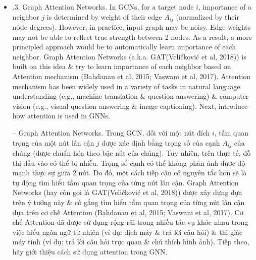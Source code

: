 \documentclass{article}
\begin{document}
\begin{itemize}
\begin{itemize}
\begin{itemize}
            {\bf Connections with Spectral Graph Convolutions.} Discuss connections between GGNs \& traditional spectral filters defined on graphs (Defferrard et al, 2016). Spectral convolutions on graphs can be defined as a multiplication of a node-wise signal ${\bf x}\in\mathbb{R}^N$ with a convoutional filter $g_\theta = {\rm diag}\theta$ ($\theta\in\mathbb{R}^N$: parameter of filter) in Fourier domain. Mathematically, (4.8)
            \begin{equation*}
                g_\theta\star{\bf x} = Ug_\theta U^\top{\bf x}.
            \end{equation*}
            $U$ represents matrix of eigenvectors of normalized graph Laplacian matrix $L = I_N - D^{-\frac{1}{2}}AD^{-\frac{1}{2}}$. $L = U\Lambda U^\top$, $\Lambda$: a diagonal matrix of eigenvalues, \& $U^\top{\bf x}$: graph Fourier transform of input signal ${\bf x}$. In practice, $g_\theta$ can be understood as a function of eigenvalues of normalized graph Laplacian matrix $L$, i.e., $g_\theta(\Lambda)$. [A lot of rigorous mathematical formulas] p. 45+++

            \item {.3. Graph Attention Networks.} In GCNs, for a target node $i$, importance of a neighbor $j$ is determined by weight of their edge $A_{ij}$ (normalized by their node degrees). However, in practice, input graph may be noisy. Edge weights may not be able to reflect true strength between 2 nodes. As a result, a more principled approach would be to automatically learn importance of each neighbor. Graph Attention Networks (a.k.a. GAT(Veličković et al, 2018)) is built on this idea \& try to learn importance of each neighbor based on Attention mechanism (Bahdanau et al, 2015; Vaswani et al, 2017). Attention mechanism has been widely used in a variety of tasks in natural language understanding (e.g., machine translation \& question answering) \& computer vision (e.g., visual question answering \& image captioning). Next, introduce how attention is used in GNNs.

            -- {\sf Graph Attention Networks.} Trong GCN, đối với một nút đích $i$, tầm quan trọng của một nút lân cận $j$ được xác định bằng trọng số của cạnh $A_{ij}$ của chúng (được chuẩn hóa theo bậc nút của chúng). Tuy nhiên, trên thực tế, đồ thị đầu vào có thể bị nhiễu. Trọng số cạnh có thể không phản ánh được độ mạnh thực sự giữa 2 nút. Do đó, một cách tiếp cận có nguyên tắc hơn sẽ là tự động tìm hiểu tầm quan trọng của từng nút lân cận. Graph Attention Networks (hay còn gọi là GAT(Veličković et al, 2018)) được xây dựng dựa trên ý tưởng này \& cố gắng tìm hiểu tầm quan trọng của từng nút lân cận dựa trên cơ chế Attention (Bahdanau et al, 2015; Vaswani et al, 2017). Cơ chế Attention đã được sử dụng rộng rãi trong nhiều tác vụ khác nhau trong việc hiểu ngôn ngữ tự nhiên (ví dụ: dịch máy \& trả lời câu hỏi) \& thị giác máy tính (ví dụ: trả lời câu hỏi trực quan \& chú thích hình ảnh). Tiếp theo, hãy giới thiệu cách sử dụng attention trong GNN.


\end{itemize}
\end{itemize}
\end{itemize}
\end{document}
